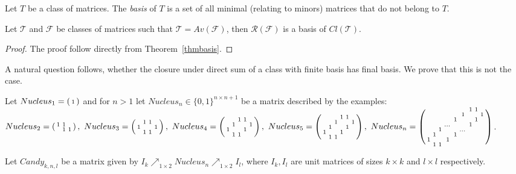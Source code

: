 \begin{defn}
Let $T$ be a class of matrices. The \emph{basis} of $T$ is a set of all minimal (relating to minors) matrices that do not belong to $T$.
\end{defn}
\begin{cor}
Let $\mathcal{T}$ and $\mathcal{F}$ be classes of matrices such that $\mathcal{T}=Av(\mathcal{F})$, then $\mathcal{R}(\mathcal{F})$ is a basis of $Cl(\mathcal{T})$.
\end{cor}
\begin{proof}
The proof follow directly from Theorem~\ref{thmbasis}.
\end{proof}
A natural question follows, whether the closure under direct sum of a class with finite basis has final basis. We prove that this is not the case.

\begin{defn}
Let $Nucleus_1=\left(\begin{smallmatrix}1\end{smallmatrix}\right)$ and for $n>1$ let $Nucleus_n\in\{0,1\}^{n\times n+1}$ be a matrix described by the examples:\\
$Nucleus_2=\left(\begin{smallmatrix}1&1& \\ &1&1\end{smallmatrix}\right),\ Nucleus_3=\left(\begin{smallmatrix} &1&1& \\1& & &1\\ &1&1& \end{smallmatrix}\right),\ Nucleus_4=\left(\begin{smallmatrix} & &1&1& \\ &1& & &1\\1& & &1& \\ &1&1& & \end{smallmatrix}\right),\\\ Nucleus_5=\left(\begin{smallmatrix} & & &1&1& \\ & &1& & &1\\ &1& & &1& \\1& & &1& & \\ &1&1& & & \end{smallmatrix}\right),\ Nucleus_n=\left(\begin{smallmatrix} & & & & & &1&1& \\ & & & & &1& & &1\\ & & & &1& & &1& \\ & & &\dots& & &1& & \\ & &1& & &\dots& & & \\ &1& & &1& & & & \\1& & &1& & & & & \\ &1&1& & & & & & \\\end{smallmatrix}\right)$.
\end{defn}
\begin{defn}
Let $Candy_{k,n,l}$ be a matrix given by $I_k\nearrow_{1\times2}Nucleus_n\nearrow_{1\times2}I_l$, where $I_k,I_l$ are unit matrices of sizes $k\times k$ and $l\times l$ respectively.
\end{defn}
